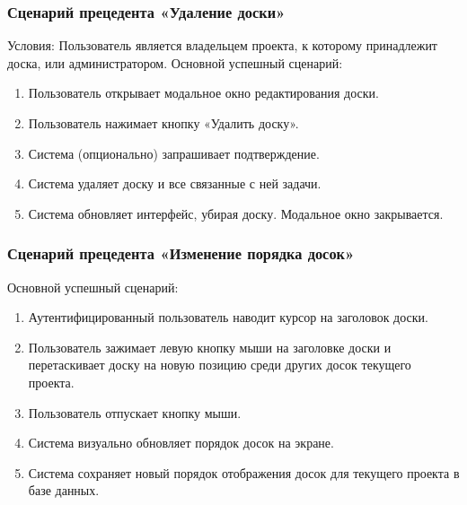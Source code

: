 \subsubsection{Сценарий прецедента «Удаление доски»}
Условия: Пользователь является владельцем проекта, к которому принадлежит доска, или администратором.
Основной успешный сценарий:
\begin{enumerate}
	\item Пользователь открывает модальное окно редактирования доски.
	\item Пользователь нажимает кнопку «Удалить доску».
	\item Система (опционально) запрашивает подтверждение.
	\item Система удаляет доску и все связанные с ней задачи.
	\item Система обновляет интерфейс, убирая доску. Модальное окно закрывается.
\end{enumerate}

\subsubsection{Сценарий прецедента «Изменение порядка досок»}
Основной успешный сценарий:
\begin{enumerate}
	\item Аутентифицированный пользователь наводит курсор на заголовок доски.
	\item Пользователь зажимает левую кнопку мыши на заголовке доски и перетаскивает доску на новую позицию среди других досок текущего проекта.
	\item Пользователь отпускает кнопку мыши.
	\item Система визуально обновляет порядок досок на экране.
	\item Система сохраняет новый порядок отображения досок для текущего проекта в базе данных.
\end{enumerate}


